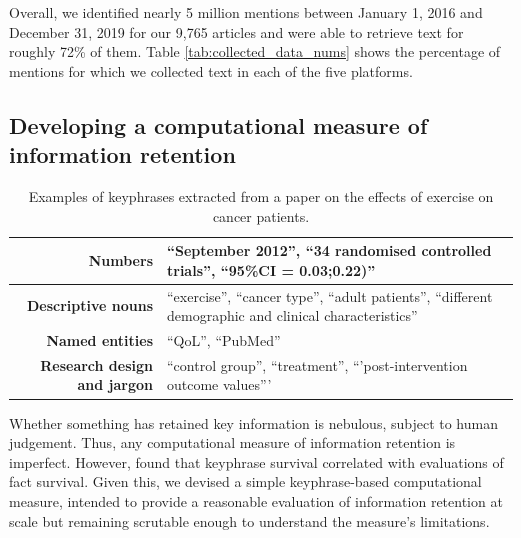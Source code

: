 \documentclass[letterpaper]{article} %
\begin{document}
Overall, we identified nearly 5 million mentions between January 1, 2016 and December 31, 2019 for our 9,765 articles and were able to retrieve text for roughly 72\% of them. Table \ref{tab:collected_data_nums} shows the percentage of mentions for which we collected text in each of the five platforms.


\subsection{Developing a computational measure of information retention}
\begin{table}[ht]
    \centering
    \begin{tabular}{r|l}
        \textbf{Numbers} & ``September 2012'', ``34 randomised controlled trials'', ``95\%CI = 0.03;0.22)''\\ \hline
         \textbf{Descriptive nouns} & ``exercise'', ``cancer type'', ``adult patients'', ``different demographic and clinical characteristics''\\ \hline
         \textbf{Named entities} & ``QoL'', ``PubMed''\\ \hline
         \textbf{Research design and jargon} & ``control group'', ``treatment'', ``'post-intervention outcome values''' \\
    \end{tabular}
    \caption{Examples of keyphrases extracted from a paper on the effects of exercise on cancer patients.}
    \label{tab:keyphrase_example}
\end{table}

Whether something has retained key information is nebulous, subject to human judgement. Thus, any computational measure of information retention is imperfect. However, \citet{ribeiroMessageDistortionInformation2019} found that keyphrase survival correlated with evaluations of fact survival. Given this, we devised a simple keyphrase-based computational measure, intended to provide a reasonable evaluation of information retention at scale but remaining scrutable enough to understand the measure's limitations.
\end{document}
